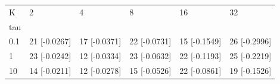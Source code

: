 \begin{tabular}{llllll}
\toprule
K & 2 & 4 & 8 & 16 & 32 \\
tau &  &  &  &  &  \\
\midrule
0.1 & 21 [-0.0267] & 17 [-0.0371] & 22 [-0.0731] & 15 [-0.1549] & 26 [-0.2996] \\
1 & 23 [-0.0242] & 12 [-0.0334] & 23 [-0.0632] & 22 [-0.1193] & 25 [-0.2219] \\
10 & 14 [-0.0211] & 12 [-0.0278] & 15 [-0.0526] & 22 [-0.0861] & 19 [-0.1526] \\
\bottomrule
\end{tabular}
